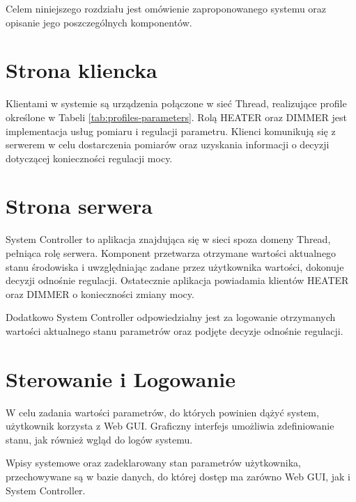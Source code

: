 Celem niniejszego rozdziału jest omówienie zaproponowanego systemu oraz opisanie jego poszczególnych komponentów. 

\section{Strona kliencka}
\label{sec:system-clients}

Klientami w systemie są urządzenia połączone w sieć Thread, realizujące profile określone w Tabeli \ref{tab:profiles-parameters}. Rolą HEATER oraz DIMMER jest implementacja usług pomiaru i regulacji parametru.
Klienci komunikują się z serwerem w celu dostarczenia pomiarów oraz uzyskania informacji o decyzji dotyczącej konieczności regulacji mocy.
    
\section{Strona serwera}

System Controller to aplikacja znajdująca się w sieci spoza domeny Thread, pełniąca rolę serwera. Komponent przetwarza otrzymane wartości aktualnego stanu środowiska i uwzględniając zadane przez użytkownika wartości, dokonuje decyzji odnośnie regulacji. Ostatecznie aplikacja powiadamia klientów HEATER oraz DIMMER o konieczności zmiany mocy.

Dodatkowo System Controller odpowiedzialny jest za logowanie otrzymanych wartości aktualnego stanu parametrów oraz podjęte decyzje odnośnie regulacji.

\section{Sterowanie i Logowanie}

W celu zadania wartości parametrów, do których powinien dążyć system, użytkownik korzysta z Web GUI. Graficzny interfejs umożliwia zdefiniowanie stanu, jak również wgląd do logów systemu.

Wpisy systemowe oraz zadeklarowany stan parametrów użytkownika, przechowywane są w bazie danych, do której dostęp ma zarówno Web GUI, jak i System Controller.